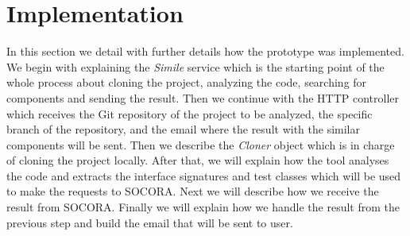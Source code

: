 \section{Implementation}
In this section we detail with further details how the prototype was implemented. We begin with explaining the \emph{Simile} service which is the starting point of the whole process about cloning the project, analyzing the code, searching for components and sending the result. Then we continue with the  HTTP controller which receives the Git repository of the project to be analyzed, the specific branch of the repository, and the email where the result with the similar components will be sent. Then we describe the \emph{Cloner} object which is in charge of cloning the project locally. After that, we will explain how the tool analyses the code and extracts the interface signatures and test classes which will be used to make the requests to SOCORA. Next we will describe how we receive the result from SOCORA. Finally we will explain how we handle the result from the previous step and build the email that will be sent to user.


